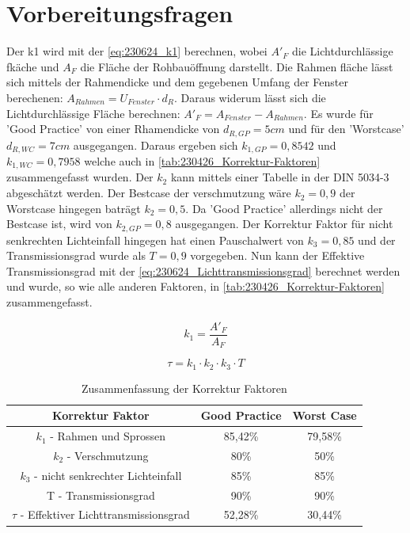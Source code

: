 \section{Vorbereitungsfragen}
\label{sec:Vorbereitungsfragen}

Der k1 wird mit der \autoref{eq:230624_k1} berechnen, wobei $A'_F$ die Lichtdurchlässige fkäche und $A_F$ die Fläche der Rohbauöffnung darstellt.
Die Rahmen fläche lässt sich mittels der Rahmendicke und dem gegebenen Umfang der Fenster berechenen: $A_{Rahmen} = U_{Fenster} \cdot d_R$. 
Daraus widerum lässt sich die Lichtdurchlässige Fläche berechnen:  $A'_F = A_{Fenster} - A_{Rahmen}$.
Es wurde für 'Good Practice' von einer Rhamendicke von $d_{R,GP} = 5cm$ und für den 'Worstcase' $d_{R,WC} = 7 cm$ ausgegangen.
Daraus ergeben sich $k_{1,GP} = 0,8542$ und $k_{1,WC} = 0,7958$ welche auch in \autoref{tab:230426_Korrektur-Faktoren} zusammengefasst wurden.
Der $k_2$ kann mittels einer Tabelle in der DIN 5034-3 abgeschätzt werden.
Der Bestcase der verschmutzung wäre $k_2 = 0,9$ der Worstcase hingegen baträgt $k_2 = 0,5$.
Da 'Good Practice' allerdings nicht der Bestcase ist, wird von $k_{2,GP} = 0,8$ ausgegangen.
Der Korrektur Faktor für nicht senkrechten Lichteinfall hingegen hat einen Pauschalwert von $k_3 = 0,85$ und der Transmissionsgrad wurde als $T = 0,9$ vorgegeben.
Nun kann der Effektive Transmissionsgrad mit der \autoref{eq:230624_Lichttransmissionsgrad} berechnet werden und wurde, so wie alle anderen Faktoren, in \autoref{tab:230426_Korrektur-Faktoren} zusammengefasst.


\begin{equation}
    k_1 = \frac{A'_F}{A_F}
    \label{eq:230624_k1}
\end{equation}

\begin{equation}
    \tau = k_1 \cdot k_2 \cdot k_3 \cdot T
    \label{eq:230624_Lichttransmissionsgrad}
\end{equation}


\begin{table}[H]
    \caption{Zusammenfassung der Korrektur Faktoren}
    \centering
    \begin{tabular}{|c|c|c|}
    \hline
    \rowcolor[HTML]{70AD47} 
    Korrektur Faktor                                & Good Practice & Worst Case \\\hline
    \rowcolor[HTML]{CFE5A8} 
    $k_1$ - Rahmen und Sprossen                     & 85,42\%       & 79,58\%    \\\hline
    \rowcolor[HTML]{A9D08E} 
    $k_2$ - Verschmutzung                           & 80\%          & 50\%       \\\hline
    \rowcolor[HTML]{CFE5A8} 
    $k_3$ - nicht senkrechter Lichteinfall          & 85\%          & 85\%       \\\hline
    \rowcolor[HTML]{A9D08E} 
    T - Transmissionsgrad                           & 90\%          & 90\%       \\\hline
    \rowcolor[HTML]{CFE5A8} 
    $\tau$ - Effektiver Lichttransmissionsgrad      & 52,28\%       & 30,44\%   \\\hline
    \end{tabular}
    \label{tab:230426_Korrektur-Faktoren}
\end{table}

